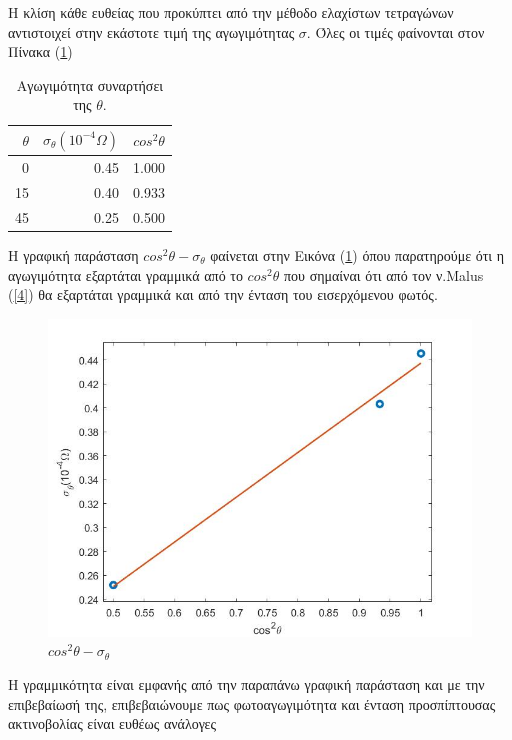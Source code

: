 \documentclass[a4paper]{article}
\begin{document}
		
Η κλίση κάθε ευθείας που προκύπτει από την μέθοδο ελαχίστων τετραγώνων αντιστοιχεί στην εκάστοτε τιμή της αγωγιμότητας $\sigma$. Όλες οι τιμές φαίνονται στον Πίνακα (\ref{mat2})		
	\begin{table}[h!]
		\centering
		\begin{tabular}{r|r|r}
			$\theta$ & $\sigma_{\theta}(10^{-4}\Omega)$ & $cos^2\theta$\\\hline\hline
			0        & 0.45		& 1.000	\\
			15       & 0.40     & 0.933 \\
			45       & 0.25     & 0.500 \\
		\end{tabular}	
	\caption{ Αγωγιμότητα συναρτήσει της $\theta$.}		
	\label{mat2}
	\end{table}
		
		Η γραφική παράσταση $cos^2\theta - \sigma_{\theta}$ φαίνεται στην Εικόνα (\ref{im3b}) όπου παρατηρούμε ότι η αγωγιμότητα εξαρτάται γραμμικά από το $cos^2\theta$ που σημαίναι ότι από τον ν.Malus (\ref{4}) θα εξαρτάται γραμμικά και από την ένταση του εισερχόμενου φωτός.
		\begin{figure}[h!]
			\centering
			\includegraphics[scale=0.45]{plot2.jpg}
			\caption{$cos^2\theta-\sigma_\theta$ }
			\label{im3b}
		\end{figure}
		
		Η γραμμικότητα είναι εμφανής από την παραπάνω γραφική παράσταση και με την επιβεβαίωσή της, επιβεβαιώνουμε πως φωτοαγωγιμότητα και ένταση προσπίπτουσας ακτινοβολίας είναι ευθέως ανάλογες
		
\end{document}
